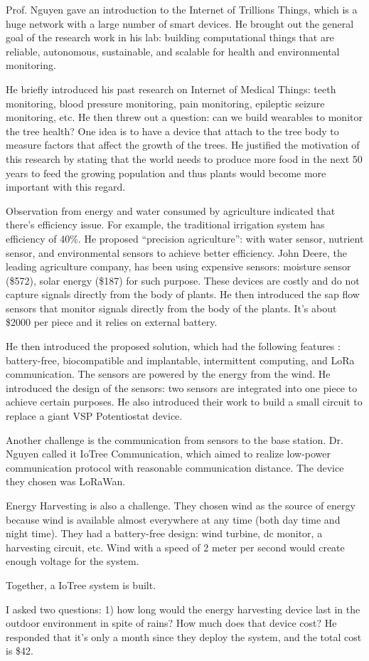 \documentclass[11pt, oneside]{article}   	%
\begin{document}
Prof. Nguyen gave an introduction to the Internet of Trillions Things, which is a huge network with a large number of smart devices. He brought out the general goal of the research work in his lab:  building computational things that are reliable, autonomous, sustainable, and scalable for health and environmental monitoring. 

He briefly introduced his past research on Internet of Medical Things: teeth monitoring, blood pressure monitoring, pain monitoring, epileptic seizure monitoring, etc.
He then threw out a question: can we build wearables to monitor the tree health? One idea is to have a device that attach to the tree body to measure factors that affect the growth of the trees. He justified the motivation of this research by stating that the world needs to produce more food in the next 50 years to feed the growing population and thus plants would become more important with this regard.

Observation from energy and water consumed by agriculture indicated that there's efficiency issue. For example, the traditional irrigation system has efficiency of 40\%. He proposed ``precision agriculture'': with water sensor, nutrient sensor, and environmental sensors to achieve better efficiency. John Deere, the leading agriculture company, has been using expensive sensors: moisture sensor (\$572), solar energy (\$187) for such purpose.  These devices are costly and do not capture signals directly from the body of plants.  He then introduced the sap flow sensors that monitor signals directly from the body of the plants. It's about \$2000 per piece and it relies on external battery. 

He then introduced the proposed solution, which  had the following features : battery-free, biocompatible and implantable, intermittent computing, and LoRa communication. The sensors are powered by the energy from the wind. He introduced the design of the sensors: two sensors are integrated into one piece to achieve certain purposes. He also introduced their work to build a small circuit to replace a giant VSP Potentiostat device. 

Another challenge is the communication from sensors to the base station. Dr. Nguyen called it IoTree Communication, which aimed to realize low-power communication protocol with reasonable communication distance. The device they chosen was LoRaWan. 

Energy Harvesting is also a challenge. They chosen wind as the source of energy because wind is available almost everywhere at any time (both day time and night time). They had a battery-free design: wind turbine, dc monitor, a harvesting circuit, etc. Wind with a speed of 2 meter per second  would create enough voltage for the system.

Together, a IoTree system is built. 

I asked two questions: 1) how long would the energy harvesting device last in the outdoor environment in spite of rains? How much does that device cost? He responded that it's only a month since they deploy the system, and the total cost is \$42.
\end{document}
